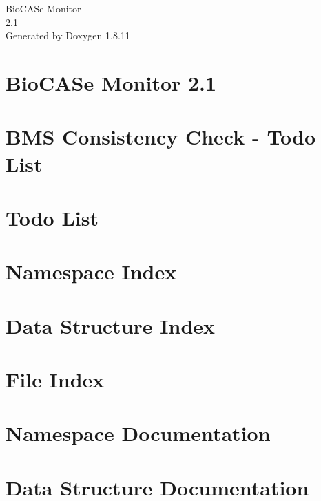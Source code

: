 \documentclass[twoside]{book}
\newcommand{\+}{\discretionary{\mbox{\scriptsize$\hookleftarrow$}}{}{}}
\newcommand{\clearemptydoublepage}{%
  \newpage{\pagestyle{empty}\cleardoublepage}%
}
\begin{document}
\hypersetup{pageanchor=false,
             bookmarksnumbered=true,
             pdfencoding=unicode
            }
\begin{titlepage}
\vspace*{7cm}
\begin{center}%
{\Large Bio\+C\+A\+Se Monitor \\[1ex]\large 2.\+1 }\\
\vspace*{1cm}
{\large Generated by Doxygen 1.8.11}\\
\end{center}
\end{titlepage}
\clearemptydoublepage
\tableofcontents
\clearemptydoublepage
{}
\hypersetup{pageanchor=true}

\chapter{Bio\+C\+A\+Se Monitor 2.1}
\label{index}\hypertarget{index}{}
\chapter{B\+MS Consistency Check -\/ Todo List}
\label{md_util_schemamappings_data_todo}
\hypertarget{md_util_schemamappings_data_todo}{}

\chapter{Todo List}
\label{todo}
\hypertarget{todo}{}

\chapter{Namespace Index}

\chapter{Data Structure Index}

\chapter{File Index}

\chapter{Namespace Documentation}



\chapter{Data Structure Documentation}

\end{document}
